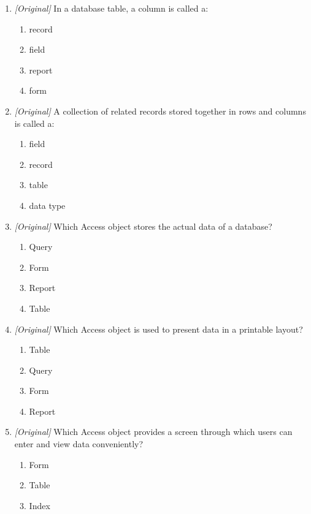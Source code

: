 \begin{enumerate}[label=\textbf{Q\arabic*.}, leftmargin=*]
\begin{enumerate}[label=\Alph*.]
    \item field
    \item table
    \item record
    \item query
  \end{enumerate}
\item \textit{[Original]} In a database table, a column is called a:
  \begin{enumerate}[label=\Alph*.]
    \item record
    \item field
    \item report
    \item form
  \end{enumerate}
\item \textit{[Original]} A collection of related records stored together in
  rows and columns is called a:
  \begin{enumerate}[label=\Alph*.]
    \item field
    \item record
    \item table
    \item data type
  \end{enumerate}
\item \textit{[Original]} Which Access object stores the actual data of a
  database?
  \begin{enumerate}[label=\Alph*.]
    \item Query
    \item Form
    \item Report
    \item Table
  \end{enumerate}
\item \textit{[Original]} Which Access object is used to present data in a
  printable layout?
  \begin{enumerate}[label=\Alph*.]
    \item Table
    \item Query
    \item Form
    \item Report
  \end{enumerate}
\item \textit{[Original]} Which Access object provides a screen through which
  users can enter and view data conveniently?
  \begin{enumerate}[label=\Alph*.]
    \item Form
    \item Table
    \item Index

\end{enumerate}
\end{enumerate}

